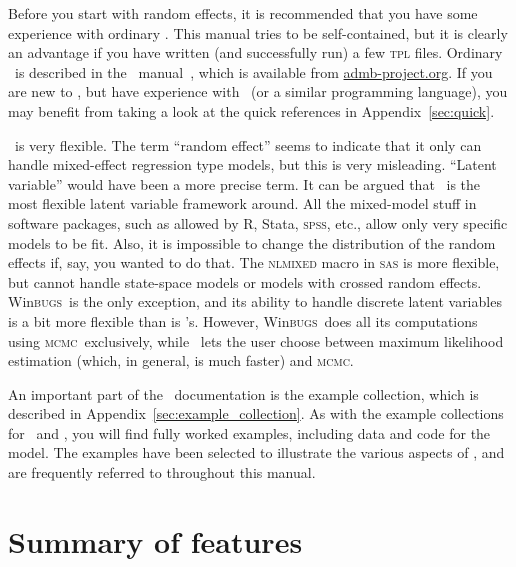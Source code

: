 \documentclass{admbmanual}
\newcommand{\scMCMC}{\textsc{mcmc}}
\newcommand{\scWinBUGS}{Win\textsc{bugs}}
\begin{document}
Before you start with random effects, it is recommended that you have some
experience with ordinary \scAB. This manual tries to be self-contained, but it
is clearly an advantage if you have written (and successfully run) a few
\textsc{tpl} files. Ordinary \scAB\ is described in the \scAB\
manual~\cite{admb_manual}, which is available from
\href{mailto:admb-project.org}{admb-project.org}. If you are new to \scAB, but
have experience with \cplus\ (or a similar programming language), you may
benefit from taking a look at the quick references in Appendix~\ref{sec:quick}.

\scAR\ is very flexible. The term ``random effect'' seems to indicate that it
only can handle mixed-effect regression type models, but this is very
misleading. ``Latent variable'' would have been a more precise term. It can be
argued that \scAR\ is the most flexible latent variable framework around. All
the mixed-model stuff in software packages, such as allowed by R, Stata,
\textsc{spss}, etc., allow only very specific models to be fit. Also, it is
impossible to change the distribution of the random effects if, say, you wanted
to do that. The \textsc{nlmixed} macro in \textsc{sas} is more flexible, but
cannot handle state-space models or models with crossed random effects.
\scWinBUGS\ is the only exception, and its ability to handle discrete latent
variables is a bit more flexible than is \scAR's. However, \scWinBUGS\ does all
its computations using \scMCMC\ exclusively, while \scAR\ lets the user choose
between maximum likelihood estimation (which, in general, is much faster) and
\scMCMC.

An important part of the \scAR\ documentation is the example collection, which
is described in Appendix~\ref{sec:example_collection}. As with the example
collections for \scAB\ and \scAD, you will find fully worked examples, including
data and code for the model. The examples have been selected to illustrate the
various aspects of \scAR, and are frequently referred to throughout this manual.

\section{Summary of features}
\end{document}
